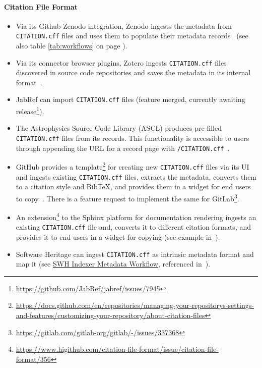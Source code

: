 \documentclass[11pt,a4paper]{scrartcl}
\newcommand{\fn}[1]{\texttt{#1}}
\begin{document}
\paragraph{Citation File Format}\label{par:metadata-integrations-cff}
\begin{itemize}  
    \item Via its Github-Zenodo integration, Zenodo ingests the metadata from \fn{CITATION.cff} files and uses them to populate their
          metadata records~\cite{sw:invenio-github} (see also table \ref{tab:workflows} on page \pageref{tab:workflows}).
    \item Via its connector browser plugins, Zotero ingests \fn{CITATION.cff} files discovered in source code repositories and saves
          the metadata in its internal format~\cite{FennerBlogCff}.
    \item JabRef can import \fn{CITATION.cff} files (feature merged, currently awaiting release\footnote{\url{https://github.com/JabRef/jabref/issues/7945}}).
    \item The Astrophysics Source Code Library (ASCL) produces pre-filled \fn{CITATION.cff} files from its records. This functionality
          is accessible to users through appending the URL for a record page with \fn{/CITATION.cff}~\cite{ASCL-Software-Citation}.
    \item GitHub provides a template\footnote{\url{https://docs.github.com/en/repositories/managing-your-repositorys-settings-and-features/customizing-your-repository/about-citation-files}}
          for creating new \fn{CITATION.cff} files via its UI and ingests existing \fn{CITATION.cff} files, extracts the metadata, converts
          them to a citation style and BibTeX, and provides them in a widget for end users to copy~\cite{FennerBlogCff}. 
          There is a feature request to implement the same for GitLab\footnote{\url{https://gitlab.com/gitlab-org/gitlab/-/issues/337368}}.
    \item An extension\footnote{\url{https://www.higithub.com/citation-file-format/issue/citation-file-format/356}} to the Sphinx platform 
          for documentation rendering ingests an existing \fn{CITATION.cff} file and, converts it to different citation formats, and provides 
          it to end users in a widget for copying (see example in~\cite{CffSphinxExample}).
    \item Software Heritage can ingest \fn{CITATION.cff} as intrinsic metadata format and map it
          (see \href{https://docs.softwareheritage.org/devel/swh-indexer/metadata-workflow.html}{SWH Indexer Metadata Workflow},
          referenced in~\cite{FennerBlogCff}).
\end{itemize}
\end{document}
